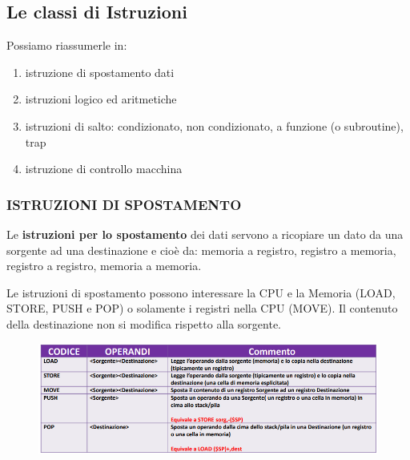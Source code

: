 \documentclass[12pt]{article}
\begin{document}
\subsection{Le classi di Istruzioni}
Possiamo riassumerle in:
\begin{enumerate}
    \item istruzione di spostamento dati
    \item istruzioni logico ed aritmetiche
    \item istruzioni di salto: condizionato, non condizionato, a funzione (o subroutine), trap
    \item  istruzione di controllo macchina
\end{enumerate}
\par\maketitle\noindent 
\subsubsection{ISTRUZIONI DI SPOSTAMENTO}
Le \textbf{istruzioni per lo spostamento} dei dati servono a ricopiare un dato da una sorgente ad una destinazione e cioè da: memoria a registro, registro a memoria, registro a registro, memoria a memoria.\par\medskip\noindent
Le istruzioni di spostamento possono interessare la CPU e la Memoria (LOAD, STORE, PUSH e POP) o solamente i registri nella CPU (MOVE). Il contenuto della destinazione non si modifica rispetto alla sorgente.
\begin{figure}[h]
    \centering
    \includegraphics[width=1\linewidth]{istruzioni di spostamento.png}
\end{figure}
\newpage
\end{document}

